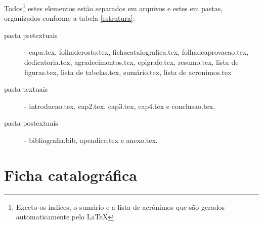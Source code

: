 Todos\footnote{Exceto os índices, o sumário e a lista de acrônimos que são gerados automaticamente pelo \LaTeX} estes elementos estão separados em arquivos e estes em pastas, organizados conforme a tabela \ref{estrutura}:

\begin{description}
\item[pasta pretextuais] - capa.tex, 
folhaderosto.tex,
fichacatalografica.tex,
folhadeaprovacao.tex,
dedicatoria.tex,
agradecimentos.tex,
epigrafe.tex,
resumo.tex,
lista de figuras.tex,
lista de tabelas.tex,
sumário.tex,
lista de acronimos.tex
\item[pasta textuais] - introducao.tex, cap2.tex, cap3.tex, cap4.tex e conclusao.tex.
\item[pasta postextuais] - bibliografia.bib, apendice.tex e anexo.tex.
\end{description}




%
%
%
%
%

\section{Ficha catalográfica}

